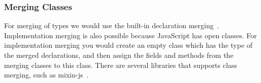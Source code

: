 \subsubsection{Merging Classes}

For merging of types we would use the built-in declaration merging~\cite{declerationmerging}.
Implementation merging is also possible because JavaScript has open classes.
For implementation merging you would create an empty class which has the type of the merged declarations, and then assign the fields and methods from the merging classes to this class.
There are several libraries that supports class merging, such as mixin-js~\cite{mixinjs}.

